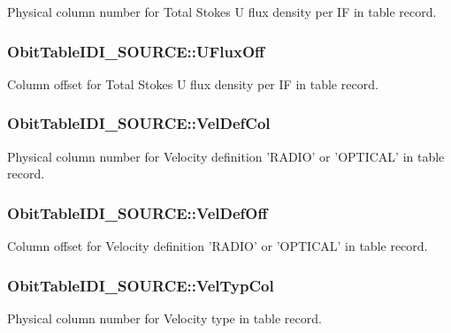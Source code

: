 Physical column number for Total Stokes U flux density per IF in table record. 

\subsubsection{ {\bf Obit\-Table\-IDI\_\-SOURCE::UFlux\-Off}}\label{structObitTableIDI__SOURCE_o56}


Column offset for Total Stokes U flux density per IF in table record. 

\subsubsection{ {\bf Obit\-Table\-IDI\_\-SOURCE::Vel\-Def\-Col}}\label{structObitTableIDI__SOURCE_o69}


Physical column number for Velocity definition 'RADIO' or 'OPTICAL' in table record. 

\subsubsection{ {\bf Obit\-Table\-IDI\_\-SOURCE::Vel\-Def\-Off}}\label{structObitTableIDI__SOURCE_o68}


Column offset for Velocity definition 'RADIO' or 'OPTICAL' in table record. 

\subsubsection{ {\bf Obit\-Table\-IDI\_\-SOURCE::Vel\-Typ\-Col}}\label{structObitTableIDI__SOURCE_o67}


Physical column number for Velocity type in table record. 

